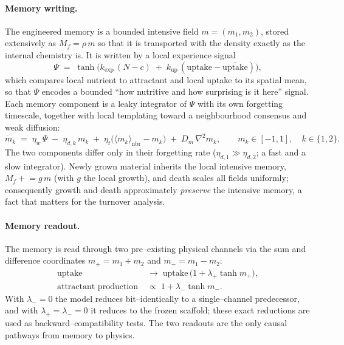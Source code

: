 \documentclass[11pt]{article}
\begin{document}
\paragraph{Memory writing.} The engineered memory is a bounded intensive field $m=(m_1,m_2)$, stored extensively as
$M_f=\rho\,m$ so that it is transported with the density exactly as the internal chemistry is. It is written by a
local experience signal
\begin{equation}
\Psi \;=\; \tanh\!\big(k_{\exp}\,(N-c) \;+\; k_{\mathrm{up}}\,(\text{uptake}-\overline{\text{uptake}})\big),
\label{eq:psi}
\end{equation}
which compares local nutrient to attractant and local uptake to its spatial mean, so that $\Psi$ encodes a bounded
``how nutritive and how surprising is it here'' signal. Each memory component is a leaky integrator of $\Psi$ with
its own forgetting timescale, together with local templating toward a neighbourhood consensus and weak diffusion:
\begin{equation}
\dot m_k \;=\; \eta_w\,\Psi \;-\; \eta_{d,k}\,m_k \;+\; \eta_t\big(\langle m_k\rangle_{\mathrm{nbr}}-m_k\big)
\;+\; D_m\,\nabla^2 m_k, \qquad m_k \in [-1,1],\quad k\in\{1,2\}.
\label{eq:write}
\end{equation}
The two components differ only in their forgetting rate ($\eta_{d,1}\gg\eta_{d,2}$; a fast and a slow integrator).
Newly grown material inherits the local intensive memory, $M_f \mathrel{+}= g\,m$ (with $g$ the local growth), and
death scales all fields uniformly; consequently growth and death approximately \emph{preserve} the intensive
memory, a fact that matters for the turnover analysis.

\paragraph{Memory readout.} The memory is read through two pre--existing physical channels via the sum and
difference coordinates $m_+=m_1+m_2$ and $m_-=m_1-m_2$:
\begin{align}
\text{uptake} &\;\to\; \text{uptake}\,\big(1+\lambda_+\tanh m_+\big), \label{eq:readplus}\\
\text{attractant production} &\;\propto\; 1+\lambda_-\tanh m_-. \label{eq:readminus}
\end{align}
With $\lambda_-=0$ the model reduces bit--identically to a single--channel predecessor, and with
$\lambda_+=\lambda_-=0$ it reduces to the frozen scaffold; these exact reductions are used as backward--compatibility
tests. The two readouts are the only causal pathways from memory to physics.
\end{document}
